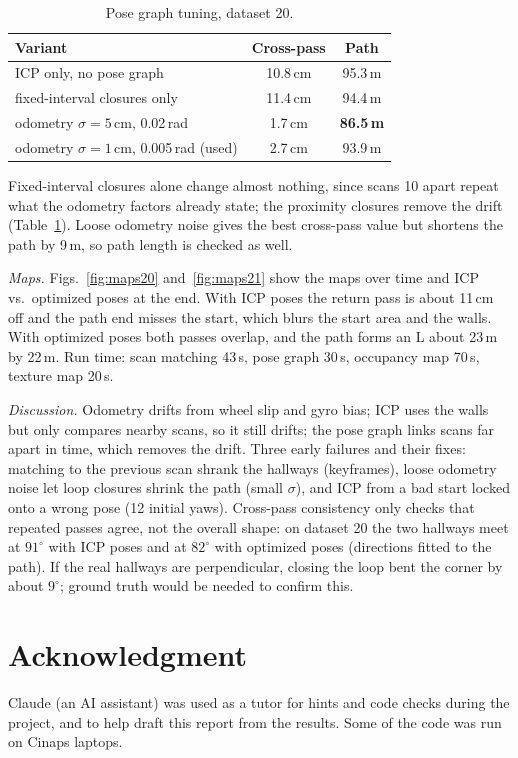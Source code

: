 \documentclass[letterpaper, 10pt, conference]{ieeeconf}
\begin{document}
\begin{table}[t]
\caption{Pose graph tuning, dataset 20.}
\label{tab:tuning}
\centering
\begin{tabular}{@{}lcc@{}}
\toprule
Variant & Cross-pass & Path \\
\midrule
ICP only, no pose graph & 10.8\,cm & 95.3\,m \\
fixed-interval closures only & 11.4\,cm & 94.4\,m \\
odometry $\sigma=5$\,cm, 0.02\,rad & 1.7\,cm & \textbf{86.5\,m} \\
odometry $\sigma=1$\,cm, 0.005\,rad (used) & 2.7\,cm & 93.9\,m \\
\bottomrule
\end{tabular}
\end{table}

Fixed-interval closures alone change almost nothing, since scans 10 apart
repeat what the odometry factors already state; the proximity closures
remove the drift (Table~\ref{tab:tuning}). Loose odometry noise gives the
best cross-pass value but shortens the path by 9\,m, so path length is
checked as well.

\emph{Maps.} Figs.~\ref{fig:maps20} and~\ref{fig:maps21} show the maps over
time and ICP vs.\ optimized poses at the end. With ICP poses the return pass
is about 11\,cm off and the path end misses the start, which blurs the start
area and the walls. With optimized poses both passes overlap, and the
path forms an L about 23\,m by 22\,m. Run time: scan matching
43\,s, pose graph 30\,s, occupancy map 70\,s, texture map 20\,s.



\emph{Discussion.} Odometry drifts from wheel slip and gyro bias; ICP uses
the walls but only compares nearby scans, so it still drifts; the pose
graph links scans far apart in time, which removes the drift. Three early
failures and their fixes: matching to the previous scan shrank the hallways
(keyframes), loose odometry noise let loop closures shrink the path (small $\sigma$), and ICP from
a bad start locked onto a wrong pose (12 initial yaws). Cross-pass
consistency only checks that repeated passes agree, not the overall shape:
on dataset 20 the two hallways meet at $91^\circ$ with ICP poses and at
$82^\circ$ with optimized poses (directions fitted to the path). If the real
hallways are perpendicular, closing the loop bent the corner by about
$9^\circ$; ground truth would be needed to confirm this.

\section*{Acknowledgment}
Claude (an AI assistant) was used as a tutor for hints and code checks
during the project, and to help draft this report from the results.
Some of the code was run on Cinaps laptops.
\end{document}
